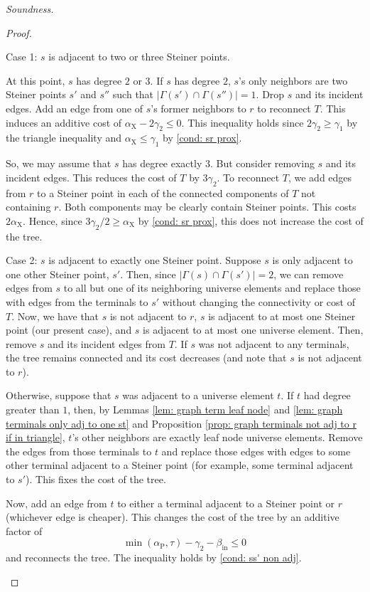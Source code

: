 \documentclass{article}\providecommand{\DeclareRedundantLanguages}[2]{}\usepackage[a4paper,margin=20mm]{geometry}
\newcommand{\1}{\textbf{1}}
\newcommand{\td}{\tau}
\newcommand{\srd}{\alpha_{\text{X}}}
\newcommand{\trd}{\alpha_{\text{P}}}
\begin{document}
\begin{paragraph}{\textit{Soundness.}}
\begin{proof}
\begin{paragraph}{Case 1: $s$ is adjacent to two or three Steiner points.}
  
  At this point, $s$ has degree $2$ or $3$. If $s$ has degree $2$, $s$'s only neighbors are two Steiner points $s'$ and $s''$ such that $|\Gamma(s') \cap \Gamma(s'')| = 1$. Drop $s$ and its incident edges. Add an edge from one of $s$'s former neighbors to $r$ to reconnect $T$. This induces an additive cost of $\srd - 2\gamma_2 \leq 0$. This inequality holds since $2\gamma_2 \geq \gamma_1$ by the triangle inequality and $\srd \leq \gamma_1$ by \ref{cond: sr prox}.
  
  So, we may assume that $s$ has degree exactly $3$. But consider removing $s$ and its incident edges. This reduces the cost of $T$ by $3\gamma_2$. To reconnect $T$, we add edges from $r$ to a Steiner point in each of the connected components of $T$ not containing $r$. Both components may be clearly contain Steiner points. This costs $2\srd$. Hence, since $3\gamma_2/2 \geq \srd$ by \ref{cond: sr prox}, this does not increase the cost of the tree.
  \end{paragraph}
  
  \begin{paragraph}{Case 2: $s$ is adjacent to exactly one Steiner point.}
  Suppose $s$ is only adjacent to one other Steiner point, $s'$. Then, since $|\Gamma(s) \cap \Gamma(s')| = 2$, we can remove edges from $s$ to all but one of its neighboring universe elements and replace those with edges from the terminals to $s'$ without changing the connectivity or cost of $T$. Now, we have that $s$ is not adjacent to $r$, $s$ is adjacent to at most one Steiner point (our present case), and $s$ is adjacent to at most one universe element. Then, remove $s$ and its incident edges from $T$. If $s$ was not adjacent to any terminals, the tree remains connected and its cost decreases (and note that $s$ is not adjacent to $r$).
  
  Otherwise, suppose that $s$ was adjacent to a universe element $t$. If $t$ had degree greater than $1$, then, by Lemmas \ref{lem: graph term leaf node} and \ref{lem: graph terminals only adj to one st} and Proposition \ref{prop: graph terminals not adj to r if in triangle}, $t$'s other neighbors are exactly leaf node universe elements. Remove the edges from those terminals to $t$ and replace those edges with edges to some other terminal adjacent to a Steiner point (for example, some terminal adjacent to $s'$). This fixes the cost of the tree.
  
   Now, add an edge from $t$ to either a terminal adjacent to a Steiner point or $r$ (whichever edge is cheaper). This changes the cost of the tree by an additive factor of
  \[
  \min(\trd, \td) - \gamma_2 - \beta_{\text{in}} \leq 0
  \]
  and reconnects the tree. The inequality holds by \ref{cond: ss' non adj}.
  \end{paragraph}


\end{proof}
\end{paragraph}
\end{document}
